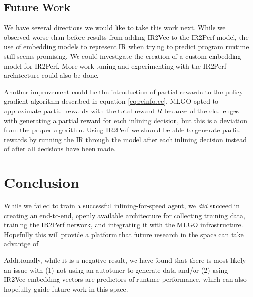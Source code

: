 \documentclass[nohyperref]{article}
\theoremstyle{plain}
\theoremstyle{definition}
\theoremstyle{remark}
\begin{document}


\subsection{Future Work}
We have several directions we would like to take this work next. While we observed worse-than-before results from adding IR2Vec to the IR2Perf model, the use of embedding models to represent IR when trying to predict program runtime still seems promising. We could investigate the creation of a custom embedding model for IR2Perf. More work tuning and experimenting with the IR2Perf architecture could also be done.

Another improvement could be the introduction of partial rewards to the policy gradient algorithm described in equation \ref{eq:reinforce}. MLGO opted to approximate partial rewards with the total reward $R$ because of the challenges with generating a partial reward for each inlining decision, but this is a deviation from the proper algorithm. Using IR2Perf we should be able to generate partial rewards by running the IR through the model after each inlining decision instead of after all decisions have been made.

\section{Conclusion}
\label{conclusion}
While we failed to train a successful inlining-for-speed agent, we \emph{did} succeed in creating an end-to-end, openly available architecture for collecting training data, training the IR2Perf network, and integrating it with the MLGO infrastructure. Hopefully this will provide a platform that future research in the space can take advantge of.

Additionally, while it is a negative result, we have found that there is most likely an issue with (1) not using an autotuner to generate data and/or (2) using IR2Vec embedding vectors are predictors of runtime performance, which can also hopefully guide future work in this space.
\end{document}
